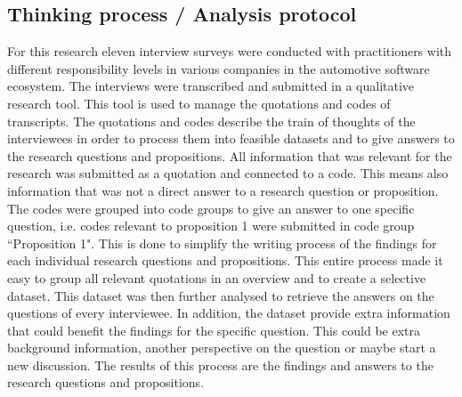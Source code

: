 \subsection{Thinking process / Analysis protocol}
For this research eleven interview surveys were conducted with practitioners with different responsibility levels in various companies in the automotive software ecosystem. The interviews were transcribed and submitted in a qualitative research tool. This tool is used to manage the quotations and codes of transcripts. The quotations and codes describe the train of thoughts of the interviewees in order to process them into feasible datasets and to give answers to the research questions and propositions. All information that was relevant for the research was submitted as a quotation and connected to a code. This means also information that was not a direct answer to a research question or proposition. The codes were grouped into code groups to give an answer to one specific question, i.e. codes relevant to proposition 1 were submitted in code group ``Proposition 1". This is done to simplify the writing process of the findings for each individual research questions and propositions. This entire process made it easy to group all relevant quotations in an overview and to create a selective dataset. This dataset was then further analysed to retrieve the answers on the questions of every interviewee. In addition, the dataset provide extra information that could benefit the findings for the specific question. This could be extra background information, another perspective on the question or maybe start a new discussion. The results of this process are the findings and answers to the research questions and propositions.